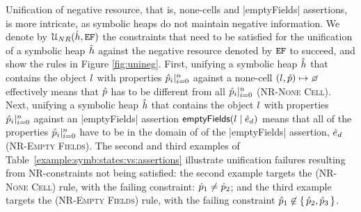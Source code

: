 %   


Unification of negative resource, that is, none-cells and \jsinline|emptyFields| assertions, is more intricate, as symbolic heaps do not maintain negative information. We denote by ${\cal U}_{NR}(\hat{h}, \mathtt{EF})$ the constraints that need to be satisfied for the unification of a symbolic heap $\hat{h}$ against the negative resource denoted by $\mathtt{EF}$ to succeed, and show the rules in Figure \ref{fig:unineg}. First, unifying a symbolic heap $\hat{h}$ that contains the object $l$ with properties $\hat{p}_i|_{i=0}^n$ against a none-cell $(\loc,\sexprp)\pointsto \none$ effectively means that $\hat{p}$ has to be different from all $\hat{p}_i|_{i=0}^n$ (\textsc{NR-None Cell}). Next, unifying a symbolic heap $\hat{h}$ that contains the object $l$ with properties $\hat{p}_i|_{i=0}^n$ against an  \jsinline|emptyFields| assertion $\mathsf{emptyFields}(l \mid \hat{e}_d)$ means that all of the properties $\hat{p}_i|_{i=0}^n$  have to be in the domain of of the \jsinline|emptyFields| assertion, $\hat{e}_d$ (\textsc{NR-Empty Fields}). 
The second and third examples of Table~\ref{example:symb:states:vs:assertions} illustrate unification failures resulting from NR-constraints not being satisfied: the second example targets the (\textsc{NR-None Cell}) rule, with the failing constraint: $\hat{p}_1 \neq \hat{p}_2$; and the third example targets the (\textsc{NR-Empty Fields}) rule, with the failing constraint $\hat{p}_1 \not\in \{ \, \hat{p}_2, \hat{p}_3 \, \}$.


